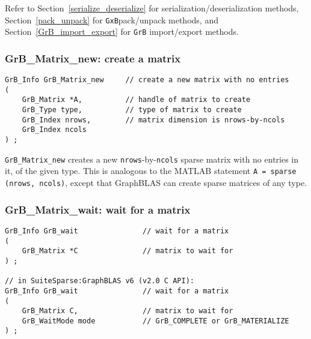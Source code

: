 \documentclass[12pt]{article}
\begin{document}
\vspace{0.2in}
Refer to
Section~\ref{serialize_deserialize} for serialization/deserialization methods,
Section~\ref{pack_unpack} for \verb'GxB'pack/unpack methods,
and
Section~\ref{GrB_import_export} for \verb'GrB' import/export methods.

\subsubsection{{\sf GrB\_Matrix\_new:}          create a matrix}
\label{matrix_new}

\begin{mdframed}[userdefinedwidth=6in]
{\footnotesize
\begin{verbatim}
GrB_Info GrB_Matrix_new     // create a new matrix with no entries
(
    GrB_Matrix *A,          // handle of matrix to create
    GrB_Type type,          // type of matrix to create
    GrB_Index nrows,        // matrix dimension is nrows-by-ncols
    GrB_Index ncols
) ;
\end{verbatim} } \end{mdframed}

\verb'GrB_Matrix_new' creates a new \verb'nrows'-by-\verb'ncols' sparse matrix
with no entries in it, of the given type.  This is analogous to the MATLAB
statement \verb'A = sparse (nrows, ncols)', except that GraphBLAS can create
sparse matrices of any type.

\newpage
\subsubsection{{\sf GrB\_Matrix\_wait:} wait for a matrix}
\label{matrix_wait}

\begin{mdframed}[userdefinedwidth=6in]
{\footnotesize
\begin{verbatim}
GrB_Info GrB_wait               // wait for a matrix
(
    GrB_Matrix *C               // matrix to wait for
) ;

// in SuiteSparse:GraphBLAS v6 (v2.0 C API):
GrB_Info GrB_wait               // wait for a matrix
(
    GrB_Matrix C,               // matrix to wait for
    GrB_WaitMode mode           // GrB_COMPLETE or GrB_MATERIALIZE
) ;
\end{verbatim}
}\end{mdframed}
\end{document}
